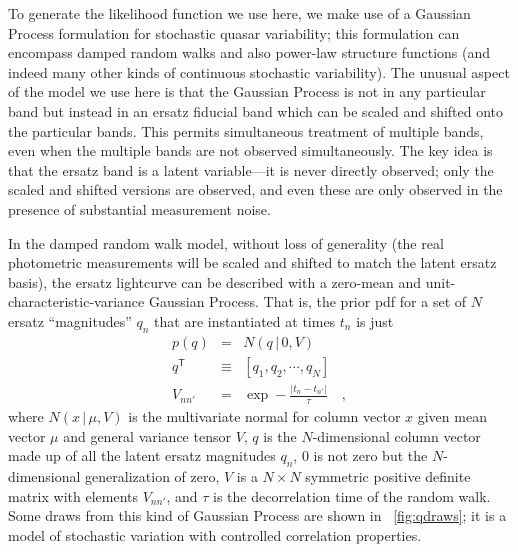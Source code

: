 \documentclass[letterpaper,12pt,preprint]{aastex}
\newcommand{\given}{\,|\,}
\newcommand{\transpose}[1]{{#1}^{\mathsf{T}}}
\begin{document}
To generate the likelihood function we use here, we make
use of a Gaussian Process formulation for stochastic quasar
variability; this formulation can encompass damped random walks
and also power-law structure functions (and indeed many other kinds of
continuous stochastic variability).  The unusual aspect of the model
we use here is that the Gaussian Process is not in any particular band
but instead in an ersatz fiducial band which can be scaled and shifted
onto the particular bands.  This permits simultaneous treatment of
multiple bands, even when the multiple bands are not observed
simultaneously.  The key idea is that the ersatz band is a latent
variable---it is never directly observed; only the scaled and shifted
versions are observed, and even these are only observed in the
presence of substantial measurement noise.

In the damped random walk model, without loss of generality (the real
photometric measurements will be scaled and shifted to match the
latent ersatz basis), the ersatz lightcurve can be described with a
zero-mean and unit-characteristic-variance Gaussian Process.  That is,
the prior pdf for a set of $N$ ersatz ``magnitudes'' $q_n$ that are
instantiated at times $t_n$ is just
\begin{eqnarray}
p(q) &=& N(q\given 0,V)
\\
\transpose{q} &\equiv& [q_1, q_2, \cdots , q_N]
\\
V_{nn'} &=& \exp -\frac{|t_n - t_{n'}|}{\tau}
\quad ,
\end{eqnarray}
where $N(x\given\mu,V)$ is the multivariate normal for column vector
$x$ given mean vector $\mu$ and general variance tensor $V$, $q$ is
the $N$-dimensional column vector made up of all the latent ersatz
magnitudes $q_n$, $0$ is not zero but the $N$-dimensional
generalization of zero, $V$ is a $N\times N$ symmetric positive
definite matrix with elements $V_{nn'}$, and $\tau$ is the
decorrelation time of the random walk.  Some draws from this kind of
Gaussian Process are shown in \figurename~\ref{fig:qdraws}; it is a
model of stochastic variation with controlled correlation properties.
\end{document}
